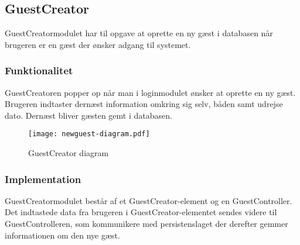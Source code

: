 \subsection{GuestCreator}
\label{sub:GuestCreator}

GuestCreatormodulet har til opgave at oprette en ny gæst i databasen når brugeren er en gæst der ønsker adgang til systemet.

\subsubsection{Funktionalitet}
\label{ssub:GuestCreator_funktionalitet}
GuestCreatoren popper op når man i loginmodulet ønsker at oprette en ny gæst. Brugeren indtaster dernæst information omkring sig selv, båden samt udrejse dato. Dernæst bliver gæsten gemt i databasen.

\begin{figure}
  \centering
  \texttt{[image: newguest-diagram.pdf]}
  \caption{GuestCreator diagram}
  \label{fig:guestcreator}
\end{figure}

\subsubsection{Implementation}
\label{ssub:GuestCreator_implementation}

GuestCreatormodulet består af et GuestCreator-element og en GuestController. Det indtastede data fra brugeren i GuestCreator-elementet sendes videre til GuestControlleren, som kommunikere med persistenslaget der derefter gemmer informationen om den nye gæst. 